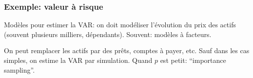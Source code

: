 \documentclass[t,usepdftitle=false]{beamer}
\begin{document}
\begin{frame}
\frametitle{Exemple: valeur à risque}

Modèles pour estimer la VAR: on doit modéliser l'évolution du prix des
actifs (souvent plusieurs milliers, dépendants). Souvent: modèles à
facteurs.

\mbox{}

On peut remplacer les actifs par des prêts, comptes à payer, etc.
Sauf dans les cas simples, on estime la VAR par simulation.
Quand $p$ est petit: ``importance sampling''. 

\end{frame}
\end{document}
